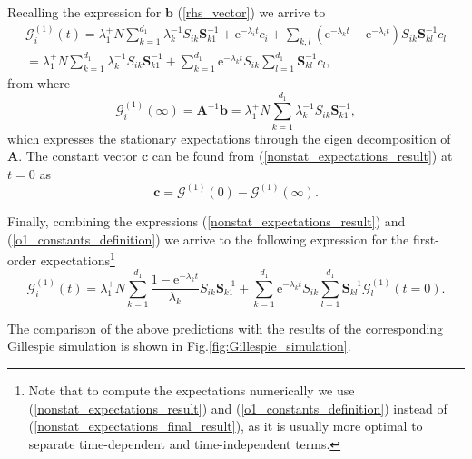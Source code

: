 \documentclass[a4paper, 11pt]{article}
\begin{document}
Recalling the expression for $\mathbf b$ (\ref{rhs_vector}) we arrive to
\begin{multline}\label{nonstat_expectations_result}
  \mathcal G^{(1)}_i(t) = \lambda_1^+N\sum_{k=1}^{d_1}\lambda_k^{-1}S_{ik}\mathbf S^{-1}_{k1} + \mathrm e^{-\lambda_it}c_i + \sum_{k,l}(\mathrm e^{-\lambda_kt}-\mathrm e^{-\lambda_it})S_{ik}\mathbf S^{-1}_{kl}c_l \\
  = \lambda_1^+N\sum_{k=1}^{d_1}\lambda_k^{-1}S_{ik}\mathbf S^{-1}_{k1} + \sum_{k=1}^{d_1}\mathrm e^{-\lambda_kt}S_{ik}\sum_{l=1}^{d_1}\mathbf S^{-1}_{kl}c_l,
\end{multline}
from where
\begin{equation}
\mathcal G^{(1)}_i(\infty) = \mathbf A^{-1}\mathbf b = \lambda_1^+N\sum_{k=1}^{d_1}\lambda_k^{-1}S_{ik}\mathbf S^{-1}_{k1},
\end{equation}
which expresses the stationary expectations through the eigen decomposition of $\mathbf A$.
The constant vector $\mathbf c$ can be found from (\ref{nonstat_expectations_result}) at $t=0$ as
\begin{equation}\label{o1_constants_definition}
  \mathbf c = \boldsymbol{\mathcal G}^{(1)}(0) - \boldsymbol{\mathcal G}^{(1)}(\infty).
\end{equation}

Finally, combining the expressions (\ref{nonstat_expectations_result}) and (\ref{o1_constants_definition}) we arrive to the following expression for the first-order expectations\footnote{Note that to compute the expectations numerically we use (\ref{nonstat_expectations_result}) and (\ref{o1_constants_definition}) instead of (\ref{nonstat_expectations_final_result}), as it is usually more optimal to separate time-dependent and time-independent terms.}
\begin{equation}\label{nonstat_expectations_final_result}
  \mathcal G^{(1)}_i(t) = \lambda_1^+N\sum_{k=1}^{d_1}\frac{1-\mathrm e^{-\lambda_kt}}{\lambda_k}S_{ik}\mathbf S^{-1}_{k1} + \sum_{k=1}^{d_1}\mathrm e^{-\lambda_kt}S_{ik}\sum_{l=1}^{d_1}\mathbf S^{-1}_{kl}\mathcal G^{(1)}_l(t=0).
\end{equation}

The comparison of the above predictions with the results of the corresponding Gillespie simulation is shown in Fig.\ref{fig:Gillespie_simulation}.
\end{document}
